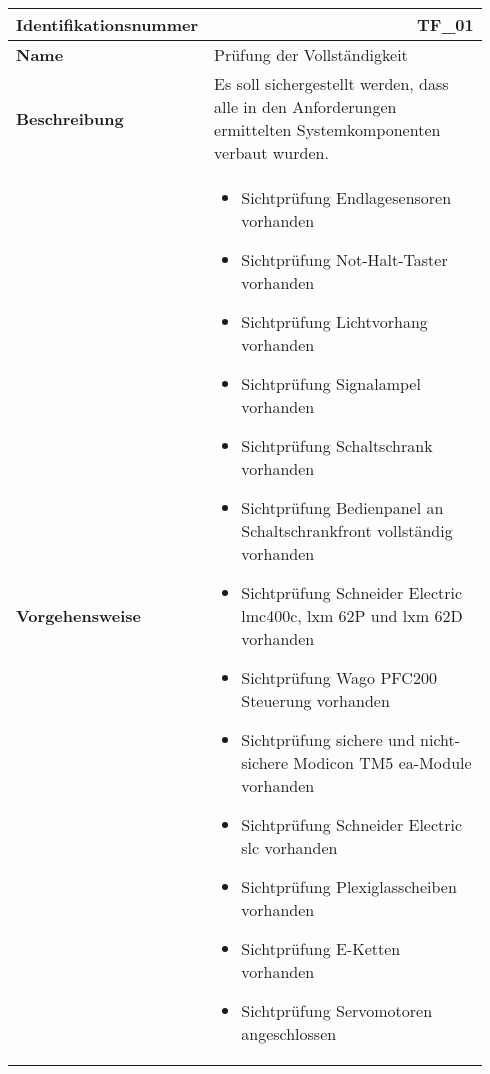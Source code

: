 \documentclass[../../../Bachelorarbeit.tex]{subfiles}
\begin{document}
\begin{table}[H]
    \centering
    \begin{tabular}{ p{0.34\linewidth}  p{0.6\linewidth} }
        \hline
        \textbf{Identifikationsnummer}  & \multicolumn{1}{r}{TF\_01} \\ \hline
        \textbf{Name}                   & Prüfung der Vollständigkeit \\
        \textbf{Beschreibung}           & Es soll sichergestellt werden, dass alle in den Anforderungen ermittelten Systemkomponenten verbaut wurden. \\
        \textbf{Vorgehensweise}         &   {\begin{itemize}[noitemsep,topsep=0pt,parsep=0pt,partopsep=0pt,leftmargin=*]
                                                \item Sichtprüfung Endlagesensoren vorhanden
                                                \item Sichtprüfung Not-Halt-Taster vorhanden
                                                \item Sichtprüfung Lichtvorhang vorhanden
                                                \item Sichtprüfung Signalampel vorhanden
                                                \item Sichtprüfung Schaltschrank vorhanden
                                                \item Sichtprüfung Bedienpanel an Schaltschrankfront vollständig vorhanden
                                                \item Sichtprüfung Schneider Electric \acs{lmc}400c, \acs{lxm} 62P und \acs{lxm} 62D vorhanden
                                                \item Sichtprüfung Wago PFC200 Steuerung vorhanden
                                                \item Sichtprüfung sichere und nicht-sichere Modicon TM5 \acs{ea}-Module vorhanden
                                                \item Sichtprüfung Schneider Electric \acs{slc} vorhanden
                                                \item Sichtprüfung Plexiglasscheiben vorhanden
                                                \item Sichtprüfung E-Ketten vorhanden
                                                \item Sichtprüfung Servomotoren angeschlossen

\end{itemize}}
\end{tabular}
\end{table}
\end{document}
